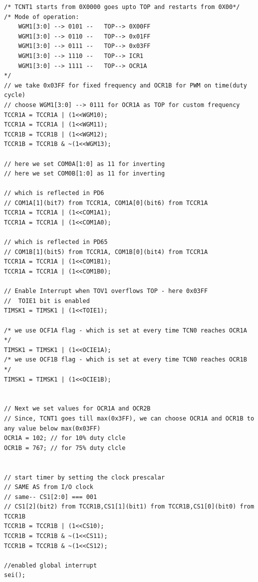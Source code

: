 \documentclass{article}
\begin{document}
\begin{verbatim}
/* TCNT1 starts from 0X0000 goes upto TOP and restarts from 0X00*/
/* Mode of operation:
    WGM1[3:0] --> 0101 --	TOP--> 0X00FF
    WGM1[3:0] --> 0110 --	TOP--> 0x01FF
    WGM1[3:0] --> 0111 --	TOP--> 0x03FF
    WGM1[3:0] --> 1110 --	TOP--> ICR1
    WGM1[3:0] --> 1111 --	TOP--> OCR1A
*/	
// we take 0x03FF for fixed frequency and OCR1B for PWM on time(duty cycle)	
// choose WGM1[3:0] --> 0111 for OCR1A as TOP for custom frequency
TCCR1A = TCCR1A | (1<<WGM10);
TCCR1A = TCCR1A | (1<<WGM11);
TCCR1B = TCCR1B | (1<<WGM12);
TCCR1B = TCCR1B & ~(1<<WGM13);

// here we set COM0A[1:0] as 11 for inverting
// here we set COM0B[1:0] as 11 for inverting

// which is reflected in PD6
// COM1A[1](bit7) from TCCR1A, COM1A[0](bit6) from TCCR1A
TCCR1A = TCCR1A | (1<<COM1A1);
TCCR1A = TCCR1A | (1<<COM1A0);

// which is reflected in PD65
// COM1B[1](bit5) from TCCR1A, COM1B[0](bit4) from TCCR1A	
TCCR1A = TCCR1A | (1<<COM1B1);
TCCR1A = TCCR1A | (1<<COM1B0);

// Enable Interrupt when TOV1 overflows TOP - here 0x03FF
//  TOIE1 bit is enabled
TIMSK1 = TIMSK1 | (1<<TOIE1);

/* we use OCF1A flag - which is set at every time TCN0 reaches OCR1A */
TIMSK1 = TIMSK1 | (1<<OCIE1A);
/* we use OCF1B flag - which is set at every time TCN0 reaches OCR1B */
TIMSK1 = TIMSK1 | (1<<OCIE1B);

        
// Next we set values for OCR1A and OCR2B
// Since, TCNT1 goes till max(0x3FF), we can choose OCR1A and OCR1B to any value below max(0x03FF)
OCR1A = 102; // for 10% duty clcle
OCR1B = 767; // for 75% duty clcle


// start timer by setting the clock prescalar
// SAME AS from I/O clock
// same-- CS1[2:0] === 001
// CS1[2](bit2) from TCCR1B,CS1[1](bit1) from TCCR1B,CS1[0](bit0) from TCCR1B
TCCR1B = TCCR1B | (1<<CS10);
TCCR1B = TCCR1B & ~(1<<CS11);
TCCR1B = TCCR1B & ~(1<<CS12);

//enabled global interrupt
sei();
\end{verbatim}
\end{document}
